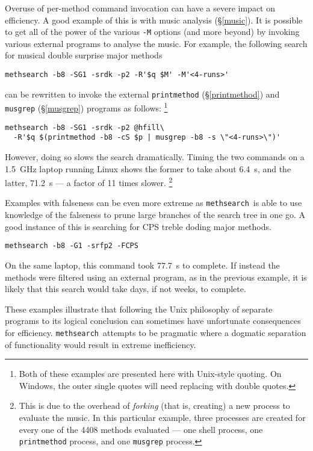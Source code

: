 \documentclass[a4paper,11pt,oneside]{book}
\makeatletter
\newcommand{\ttcmdidx}[1]{\texttt{#1}\index{#1@{\texttt{#1}}}}
\def\methsearch{\texttt{meth\-search}}
\newcommand{\sref}[1]{\hyperref[#1]{\S\ref{#1}}}
\makeatother
\begin{document}
Overuse of per-method command invocation can have a severe impact on 
efficiency.  A good example of this is with music analysis (\sref{music}).
It is possible to get all of the power of the various \verb+-M+ options (and
more beyond) by invoking various external programs to analyse the music.
For example, the following search for musical double surprise major methods%
\begin{Verbatim}
methsearch -b8 -SG1 -srdk -p2 -R'$q $M' -M'<4-runs>'
\end{Verbatim}
can be rewritten to invoke the external \ttcmdidx{printmethod}
(\sref{printmethod}) and \ttcmdidx{musgrep} (\sref{musgrep}) programs 
as follows:%
\footnote{Both of these examples are presented here
with Unix-style quoting.  
On Windows, the outer single quotes will need replacing with double quotes.}
\begin{Verbatim}[commandchars=@~~]
methsearch -b8 -SG1 -srdk -p2 @hfill\
  -R'$q $(printmethod -b8 -cS $p | musgrep -b8 -s \"<4-runs>\")'
\end{Verbatim}
However, doing so slows the search dramatically.
Timing the two commands on a 1.5\ GHz laptop running Linux shows the former
to take about 6.4\ s, and the latter, 71.2\ s --- a factor of 11 times slower.%
\footnote{This is due to the overhead of \textit{forking}%
 (that is, creating) a new process to evaluate 
the music.  
In this particular example, three processes are created for every one of 
the 4408 methods evaluated --- one shell\index{shell} process, 
one \texttt{printmethod} process, and one \texttt{musgrep} process.}

Examples with falseness can be even more extreme as \methsearch\ is able to
use knowledge of the falseness to prune large branches of the search tree
in one go.  A good instance of this is searching for 
CPS treble doding major methods.
\begin{Verbatim}
methsearch -b8 -G1 -srfp2 -FCPS
\end{Verbatim}
On the same laptop, this command took 77.7\ s to complete.  If instead the
methods were filtered using an external program, as in the previous example,
it is likely that this search would take days, if not weeks, to complete.

These examples illustrate that following the Unix philosophy%
 of separate programs to its logical conclusion 
can sometimes have unfortunate consequences for efficiency.  \methsearch\ 
attempts to be pragmatic where a dogmatic separation of functionality would
result in extreme inefficiency.
\end{document}
